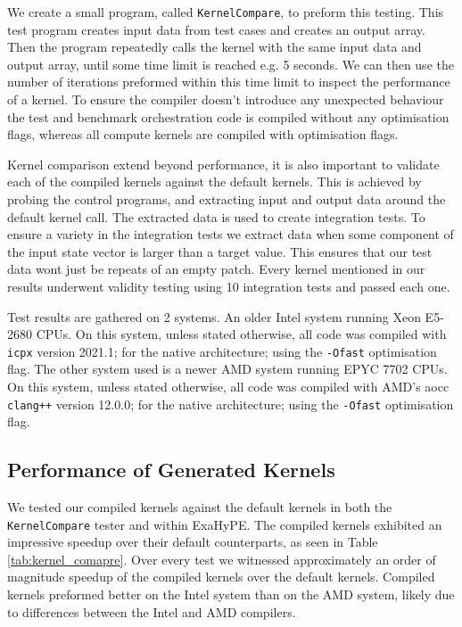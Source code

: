 We create a small program, called \texttt{KernelCompare}, to preform this testing.
This test program creates input data from test cases and creates an output array.
Then the program repeatedly calls the kernel with the same input data and output array, until some time limit is reached e.g. 5 seconds.
We can then use the number of iterations preformed within this time limit to inspect the performance of a kernel.
To ensure the compiler doesn't introduce any unexpected behaviour the test and benchmark orchestration code is compiled without any optimisation flags, whereas all compute kernels are compiled with optimisation flags.

Kernel comparison extend beyond performance, it is also important to validate each of the compiled kernels against the default kernels.
This is achieved by probing the control programs, and extracting input and output data around the default kernel call.
The extracted data is used to create integration tests.
To ensure a variety in the integration tests we extract data when some component of the input state vector is larger than a target value. 
This ensures that our test data wont just be repeats of an empty patch.
Every kernel mentioned in our results underwent validity testing using 10 integration tests and passed each one.

Test results are gathered on 2 systems.
An older Intel system running Xeon E5-2680 CPUs.
On this system, unless stated otherwise, all code was compiled with \texttt{icpx} version 2021.1; for the native architecture; using the \texttt{-Ofast} optimisation flag.
The other system used is a newer AMD system running EPYC 7702 CPUs.
On this system, unless stated otherwise, all code was compiled with AMD's aocc \texttt{clang++} version 12.0.0; for the native architecture; using the \texttt{-Ofast} optimisation flag. 

\subsection{Performance of Generated Kernels}

We tested our compiled kernels against the default kernels in both the \texttt{KernelCompare} tester and within ExaHyPE.
The compiled kernels exhibited an impressive speedup over their default counterparts, as seen in Table \ref{tab:kernel_comapre}.
Over every test we witnessed approximately an order of magnitude speedup of the compiled kernels over the default kernels.
Compiled kernels preformed better on the Intel system than on the AMD system, likely due to differences between the Intel and AMD compilers. 

